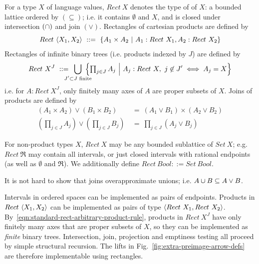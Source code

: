 \documentclass{llncs}
\newcommand{\figref}[1]{Fig.~\ref{#1}}
\newcommand{\join}{\vee}
\begin{document}
\begin{definition}
\label{def:standard-rectangle}
For a type $X$ of language values, $Rect~X$ denotes the type of  of $X$: a bounded lattice ordered by $(\subseteq)$; i.e. it contains $\emptyset$ and $X$, and is closed under intersection $(\cap)$ and join $(\join)$.
Rectangles of cartesian products are defined by
\begin{equation}
	Rect~\langle{X_1,X_2}\rangle \ ::= \ \lbrace {A_1 \times A_2} \ \lvert\ {A_1 : Rect~X_1, A_2 : Rect~X_2} \rbrace
\label{eqn:standard-rect-finite-product-rule}
\end{equation}
Rectangles of infinite binary trees (i.e. products indexed by $J$) are defined by
\begin{equation}
	Rect~X^J \ ::= \ \,\displaystyle\bigcup_{\mathclap{J' \subset J \text{ finite}}}\ 
		\left\{\textstyle\prod_{j \in J} A_j\ \middle| \ A_j : Rect~X,\ j \not\in J' \iff A_j = X \right\}
\label{eqn:standard-rect-arbitrary-product-rule}
\end{equation}
i.e. for $A : Rect~X^J$, only finitely many axes of $A$ are proper subsets of $X$.
Joins of products are defined by
\begin{align}
	(A_1 \times A_2) \join (B_1 \times B_2) &\ = \ (A_1 \join B_1) \times (A_2 \join B_2) \\
	(\textstyle\prod_{j \in J} A_j) \join (\textstyle\prod_{j \in J} B_j) &\ = \ \textstyle\prod_{j \in J} (A_j \join B_j)
\end{align}
\end{definition}

For non-product types $X$, $Rect~X$ may be any bounded sublattice of $Set~X$; e.g. $Rect~\Re$ may contain all intervals, or just closed intervals with rational endpoints (as well as $\emptyset$ and $\Re$).
We additionally define $Rect~Bool ::= Set~Bool$.

It is not hard to show that joins overapproximate unions; i.e. $A \u B \subseteq A \join B$.

Intervals in ordered spaces can be implemented as pairs of endpoints.
Products in $Rect~\langle{X_1,X_2}\rangle$ can be implemented as pairs of type $\langle{Rect~X_1,Rect~X_2}\rangle$.
By~\eqref{eqn:standard-rect-arbitrary-product-rule}, products in $Rect~X^J$ have only finitely many axes that are proper subsets of $X$, so they can be implemented as \emph{finite} binary trees.
Intersection, join, projection and emptiness testing all proceed by simple structural recursion.
The lifts in \figref{fig:extra-preimage-arrow-defs} are therefore implementable using rectangles.
\end{document}

